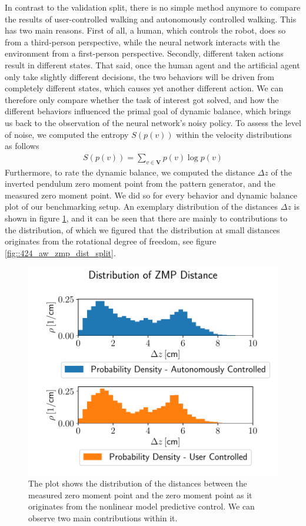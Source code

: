 In contrast to the validation split, there is no simple method anymore to compare the results of user-controlled walking and autonomously controlled walking. This has two main reasons. First of all, a human, which controls the robot, does so from a third-person perspective, while the neural network interacts with the environment from a first-person perspective. Secondly, different taken actions result in different states. That said, once the human agent and the artificial agent only take slightly different decisions, the two behaviors will be driven from completely different states, which causes yet another different action. We can therefore only compare whether the task of interest got solved, and how the different behaviors influenced the primal goal of dynamic balance, which brings us back to the observation of the neural network's noisy policy. To assess the level of noise, we computed the entropy $S(p(v))$ within the velocity distributions as follows
\begin{align}
	S(p(v)) = \sum_{v\in \bm{V}}p(v)\log p(v)
\end{align}
Furthermore, to rate the dynamic balance, we computed the distance $\Delta z$ of the inverted pendulum zero moment point from the pattern generator, and the measured zero moment point. We did so for every behavior and dynamic balance plot of our benchmarking setup. An exemplary distribution of the distances $\Delta z$ is shown in figure \ref{fig::424_aw_zmp_dist}, and it can be seen that there are mainly to contributions to the distribution, of which we figured that the distribution at small distances originates from the rotational degree of freedom, see figure \ref{fig::424_aw_zmp_dist_split}.
\begin{figure}[h!] 
	\centering
	\includegraphics[scale=.45]{chapters/04_experiments/02_autonomous_walking/zmp_distribution_benchmark.pdf}
	\caption{The plot shows the distribution of the distances between the measured zero moment point and the zero moment point as it originates from the nonlinear model predictive control. We can observe two main contributions within it.}
	\label{fig::424_aw_zmp_dist}
\end{figure} 
